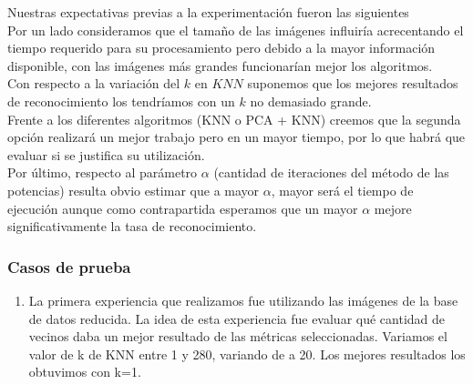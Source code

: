 
\par Nuestras expectativas previas a la experimentación fueron las siguientes\\
Por un lado consideramos que el tamaño de las im\'agenes influiría acrecentando el tiempo requerido para su procesamiento pero debido a la mayor informaci\'on disponible, con las imágenes más grandes 
funcionarían mejor los algoritmos.\\
Con respecto a la variaci\'on del $k$ en $KNN$ suponemos que los mejores resultados de reconocimiento los tendríamos con un $k$ no demasiado grande.\\
Frente a los diferentes algoritmos (KNN o PCA + KNN) creemos que la segunda opci\'on realizar\'a un mejor trabajo pero en un mayor tiempo, por lo que habr\'a que evaluar si se justifica su utilizaci\'on.\\
Por \'ultimo, respecto al par\'ametro $\alpha$ (cantidad de iteraciones del m\'etodo de las potencias) resulta obvio estimar que a mayor $\alpha$, mayor ser\'a el tiempo de ejecución aunque como contrapartida esperamos que un mayor $\alpha$ mejore significativamente la tasa de reconocimiento.

\subsubsection*{Casos de prueba}

\begin{enumerate}
\item La primera experiencia que realizamos fue utilizando las imágenes de la base de datos reducida. La idea de esta experiencia fue evaluar qué cantidad de vecinos daba un mejor resultado de las métricas seleccionadas. Variamos el valor de k de KNN entre 1 y 280, variando de a 20. Los mejores resultados los obtuvimos con k=1.
\end{enumerate}
